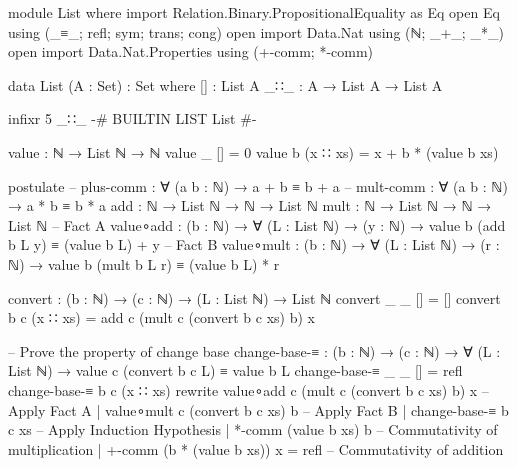 module List where    
    import Relation.Binary.PropositionalEquality as Eq
    open Eq using (_≡_; refl; sym; trans; cong)
    open import Data.Nat using (ℕ; _+_; _*_)
    open import Data.Nat.Properties using (+-comm; *-comm)

    data List (A : Set) : Set where
        []   : List A
        _∷_ :  A → List A → List A

    infixr 5 _∷_
    {-# BUILTIN LIST List #-}

    value : ℕ → List ℕ → ℕ
    value _ [] = 0
    value b (x ∷ xs) = x + b * (value b xs)


    postulate
        -- plus-comm : ∀ (a b : ℕ) → a + b ≡ b + a
        -- mult-comm : ∀ (a b : ℕ) → a * b ≡ b * a
        add  : ℕ → List ℕ → ℕ → List ℕ
        mult : ℕ → List ℕ → ℕ → List ℕ
        -- Fact A
        value∘add  : (b : ℕ) → ∀ (L : List ℕ) → (y : ℕ) → value b (add b L y) ≡ (value b L) + y
        -- Fact B
        value∘mult : (b : ℕ) → ∀ (L : List ℕ) → (r : ℕ) → value b (mult b L r) ≡ (value b L) * r

    convert : (b : ℕ) → (c : ℕ) → (L : List ℕ) → List ℕ
    convert _ _ [] = []
    convert b c (x ∷ xs) = add c (mult c (convert b c xs) b) x

    -- Prove the property of change base
    change-base-≡ : (b : ℕ) → (c : ℕ) → ∀ (L : List ℕ) → value c (convert b c L) ≡ value b L
    change-base-≡ _ _ [] = refl
    change-base-≡ b c (x ∷ xs) 
                            rewrite value∘add c (mult c (convert b c xs) b) x   -- Apply Fact A
                                | value∘mult c (convert b c xs) b               -- Apply Fact B
                                | change-base-≡ b c xs                          -- Apply Induction Hypothesis
                                | *-comm (value b xs) b                      -- Commutativity of multiplication
                                | +-comm (b * (value b xs)) x = refl         -- Commutativity of addition
